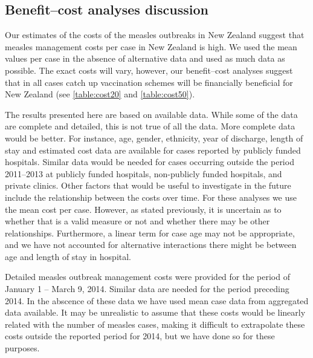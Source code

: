 \documentclass{article}
\begin{document}
\subsection{Benefit--cost analyses discussion}

Our estimates of the costs of the measles outbreaks in New Zealand suggest that measles management costs per case in New Zealand is high. We used the mean values per case in the absence of alternative data and used as much data as possible. The exact costs will vary, however, our benefit--cost analyses suggest that in all cases catch up vaccination schemes will be financially beneficial for New Zealand (see \autoref{table:cost20} and \autoref{table:cost50}).

The results presented here are based on available data. While some of the data are complete and detailed, this is not true of all the data. More complete data would be better. For instance, age, gender, ethnicity, year of discharge, length of stay and estimated cost data are available for cases reported by publicly funded hospitals. Similar data would be needed for cases occurring outside the period 2011--2013 at publicly funded hospitals, non-publicly funded hospitals, and private clinics. Other factors that would be useful to investigate in the future include the relationship between the costs over time. For these analyses we use the mean cost per case. However, as stated previously, it is uncertain as to whether that is a valid measure or not and whether there may be other relationships. Furthermore, a linear term for case age may not be appropriate, and we have not accounted for alternative interactions there might be between age and length of stay in hospital.

Detailed measles outbreak management costs were provided for the period of January 1 -- March 9, 2014. Similar data are needed for the period preceding 2014. In the abscence of these data we have used mean case data from aggregated data available. It may be unrealistic to assume that these costs would be linearly related with the number of measles cases, making it difficult to extrapolate these costs outside the reported period for 2014, but we have done so for these purposes.
\end{document}
